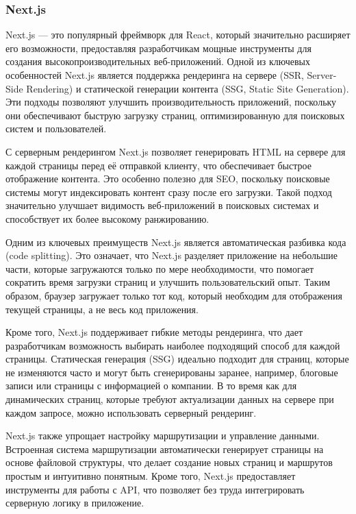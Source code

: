 \subsubsection{Next.js}

Next.js — это популярный фреймворк для React, который значительно расширяет его возможности, предоставляя разработчикам мощные инструменты для создания высокопроизводительных веб-приложений. Одной из ключевых особенностей Next.js является поддержка рендеринга на сервере (SSR, Server-Side Rendering) и статической генерации контента (SSG, Static Site Generation). Эти подходы позволяют улучшить производительность приложений, поскольку они обеспечивают быструю загрузку страниц, оптимизированную для поисковых систем и пользователей.

С серверным рендерингом Next.js позволяет генерировать HTML на сервере для каждой страницы перед её отправкой клиенту, что обеспечивает быстрое отображение контента. Это особенно полезно для SEO, поскольку поисковые системы могут индексировать контент сразу после его загрузки. Такой подход значительно улучшает видимость веб-приложений в поисковых системах и способствует их более высокому ранжированию.

Одним из ключевых преимуществ Next.js является автоматическая разбивка кода (code splitting). Это означает, что Next.js разделяет приложение на небольшие части, которые загружаются только по мере необходимости, что помогает сократить время загрузки страниц и улучшить пользовательский опыт. Таким образом, браузер загружает только тот код, который необходим для отображения текущей страницы, а не весь код приложения.

Кроме того, Next.js поддерживает гибкие методы рендеринга, что дает разработчикам возможность выбирать наиболее подходящий способ для каждой страницы. Статическая генерация (SSG) идеально подходит для страниц, которые не изменяются часто и могут быть сгенерированы заранее, например, блоговые записи или страницы с информацией о компании. В то время как для динамических страниц, которые требуют актуализации данных на сервере при каждом запросе, можно использовать серверный рендеринг.

Next.js также упрощает настройку маршрутизации и управление данными. Встроенная система маршрутизации автоматически генерирует страницы на основе файловой структуры, что делает создание новых страниц и маршрутов простым и интуитивно понятным. Кроме того, Next.js предоставляет инструменты для работы с API, что позволяет без труда интегрировать серверную логику в приложение.

